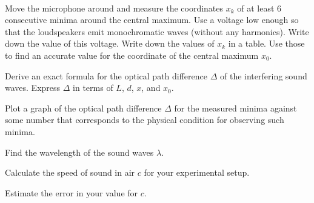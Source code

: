 \documentclass[../TST.tex]{subfiles}
\begin{document}
\begin{eproblem}{\ \\[5pt]}
\begin{subpart}[resume]
	\item Move the microphone around and measure the coordinates $x_k$ of at least 6 consecutive minima around the central maximum. Use a voltage low enough so that the loudspeakers emit monochromatic waves (without any harmonics). Write down the value of this voltage. Write down the values of $x_k$ in a table. Use those to find an accurate value for the coordinate of the central maximum $x_0$. 
	\item Derive an exact formula for the optical path difference $\Delta$ of the interfering sound waves. Express $\Delta$ in terms of $L$, $d$, $x$, and $x_0$. 
	\item Plot a graph of the optical path difference $\Delta$ for the measured minima against some number that corresponds to the physical condition for observing such minima. 
	\item Find the wavelength of the sound waves $\lambda$. 
	\item Calculate the speed of sound in air $c$ for your experimental setup. 
	\item Estimate the error in your value for $c$. 
\end{subpart}
\end{eproblem}
\end{document}

